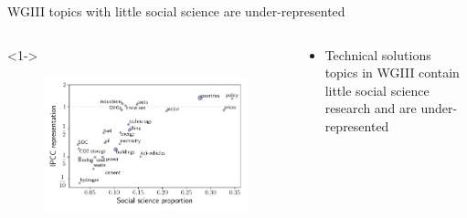 \documentclass[9pt, aspectratio=169]{beamer}
\begin{document}
\begin{frame}{WGIII topics with little social science are under-represented}

\vspace{-0.5cm}

\begin{columns}
	
	\begin{column}{0.618\linewidth}<1->
		\begin{figure}[h!]
			\begin{center}
				\includegraphics[width=\linewidth]{../plots/run_1861_wg3_socsci_lp.pdf}
			\end{center}
		\end{figure}
		
	\end{column}
	\begin{column}{0.382\linewidth}
		\begin{itemize}
			\item<1-> Technical solutions topics in WGIII contain little social science research and are under-represented
			
			
		\end{itemize}
	\end{column}
\end{columns}
\end{frame}
\end{document}
